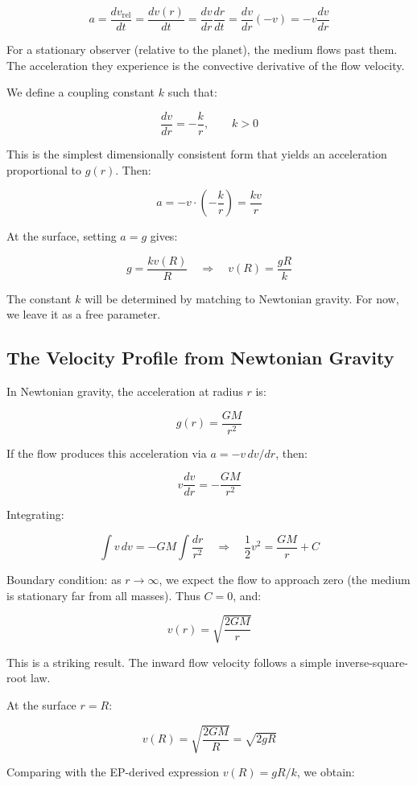 \documentclass[12pt, a4paper]{article}
\begin{document}
\[
a = \frac{d v_{\text{rel}}}{dt} = \frac{d v(r)}{dt} = \frac{dv}{dr} \frac{dr}{dt} = \frac{dv}{dr} (-v) = -v \frac{dv}{dr}
\]

For a stationary observer (relative to the planet), the medium flows past them. The acceleration they experience is the convective derivative of the flow velocity.

We define a coupling constant \( k \) such that:

\[
\frac{dv}{dr} = -\frac{k}{r}, \qquad k > 0
\]

This is the simplest dimensionally consistent form that yields an acceleration proportional to \( g(r) \). Then:

\[
a = -v \cdot \left(-\frac{k}{r}\right) = \frac{k v}{r}
\]

At the surface, setting \( a = g \) gives:

\[
g = \frac{k v(R)}{R} \quad \Rightarrow \quad v(R) = \frac{g R}{k}
\]

The constant \( k \) will be determined by matching to Newtonian gravity. For now, we leave it as a free parameter.

\subsection{The Velocity Profile from Newtonian Gravity}
\label{subsec:velocity_profile}

In Newtonian gravity, the acceleration at radius \( r \) is:

\[
g(r) = \frac{GM}{r^2}
\]

If the flow produces this acceleration via \( a = -v \, dv/dr \), then:

\[
v \frac{dv}{dr} = -\frac{GM}{r^2}
\]

Integrating:

\[
\int v \, dv = -GM \int \frac{dr}{r^2} \quad \Rightarrow \quad \frac{1}{2} v^2 = \frac{GM}{r} + C
\]

Boundary condition: as \( r \to \infty \), we expect the flow to approach zero (the medium is stationary far from all masses). Thus \( C = 0 \), and:

\[
v(r) = \sqrt{\frac{2GM}{r}}
\]

This is a striking result. The inward flow velocity follows a simple inverse-square-root law.

At the surface \( r = R \):

\[
v(R) = \sqrt{\frac{2GM}{R}} = \sqrt{2gR}
\]

Comparing with the EP-derived expression \( v(R) = gR/k \), we obtain:
\end{document}
